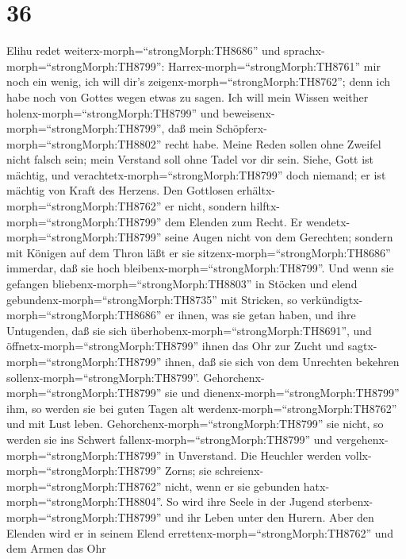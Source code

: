 \hypertarget{section-35}{%
\section{36}\label{section-35}}

 Elihu redet weiterx-morph=``strongMorph:TH8686'' und
sprachx-morph=``strongMorph:TH8799'': 
Harrex-morph=``strongMorph:TH8761'' mir noch ein wenig, ich will dir's
zeigenx-morph=``strongMorph:TH8762''; denn ich habe noch von Gottes
wegen etwas zu sagen.  Ich will mein Wissen weither
holenx-morph=``strongMorph:TH8799'' und
beweisenx-morph=``strongMorph:TH8799'', daß mein
Schöpferx-morph=``strongMorph:TH8802'' recht habe.  Meine
Reden sollen ohne Zweifel nicht falsch sein; mein Verstand soll ohne
Tadel vor dir sein.  Siehe, Gott ist mächtig, und
verachtetx-morph=``strongMorph:TH8799'' doch niemand; er ist mächtig von
Kraft des Herzens.  Den Gottlosen
erhältx-morph=``strongMorph:TH8762'' er nicht, sondern
hilftx-morph=``strongMorph:TH8799'' dem Elenden zum Recht. 
Er wendetx-morph=``strongMorph:TH8799'' seine Augen nicht von dem
Gerechten; sondern mit Königen auf dem Thron läßt er sie
sitzenx-morph=``strongMorph:TH8686'' immerdar, daß sie hoch
bleibenx-morph=``strongMorph:TH8799''.  Und wenn sie
gefangen bliebenx-morph=``strongMorph:TH8803'' in Stöcken und elend
gebundenx-morph=``strongMorph:TH8735'' mit Stricken,  so
verkündigtx-morph=``strongMorph:TH8686'' er ihnen, was sie getan haben,
und ihre Untugenden, daß sie sich
überhobenx-morph=``strongMorph:TH8691'',  und
öffnetx-morph=``strongMorph:TH8799'' ihnen das Ohr zur Zucht und
sagtx-morph=``strongMorph:TH8799'' ihnen, daß sie sich von dem Unrechten
bekehren sollenx-morph=``strongMorph:TH8799''. 
Gehorchenx-morph=``strongMorph:TH8799'' sie und
dienenx-morph=``strongMorph:TH8799'' ihm, so werden sie bei guten Tagen
alt werdenx-morph=``strongMorph:TH8762'' und mit Lust leben.
 Gehorchenx-morph=``strongMorph:TH8799'' sie nicht, so
werden sie ins Schwert fallenx-morph=``strongMorph:TH8799'' und
vergehenx-morph=``strongMorph:TH8799'' in Unverstand.  Die
Heuchler werden vollx-morph=``strongMorph:TH8799'' Zorns; sie
schreienx-morph=``strongMorph:TH8762'' nicht, wenn er sie gebunden
hatx-morph=``strongMorph:TH8804''.  So wird ihre Seele in
der Jugend sterbenx-morph=``strongMorph:TH8799'' und ihr Leben unter den
Hurern.  Aber den Elenden wird er in seinem Elend
errettenx-morph=``strongMorph:TH8762'' und dem Armen das Ohr
